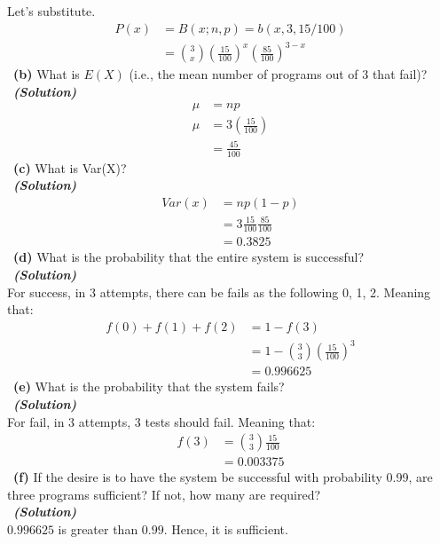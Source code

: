 \documentclass[a4 paper]{article}
\numberwithin{equation}{section}
\newcommand{\subproblem}[1]{~\newline\textbf{(#1)}}
\newcommand{\solution}{~\newline\textbf{\textit{(Solution)}} }
\newcommand{\0}{\mathbf{0}}
\begin{document}
Let's substitute.
\begin{align*}
    P(x) &= B(x; n, p) = b(x, 3, 15 / 100) \\
    &= \binom{3}{x} (\frac{15}{100})^x (\frac{85}{100})^{3-x} 
\end{align*}{}
\newline
\subproblem{b} What is $E(X)$ (i.e., the mean number of programs out of 3 that fail)?\\
\solution \\
\begin{align*}
    \mu &= np \\
    \mu &= 3 (\frac{15}{100}) \\
    &= \frac{45}{100}
\end{align*}{}
\newline
\subproblem{c} What is Var(X)?\\
\solution \\
\begin{align*}
    Var(x) &= np(1-p) \\
    &= 3 \frac{15}{100}\frac{85}{100} \\
    &= 0.3825
\end{align*}{}
\newline
\subproblem{d} What is the probability that the entire system is successful?\\
\solution \\
For success, in 3 attempts, there can be fails as the following 0, 1, 2. Meaning that:
\begin{align*}
    f(0) + f(1) + f(2) &= 1 - f(3) \\ 
    &= 1 - \binom{3}{3} (\frac{15}{100})^3 \\
    &= 0.996625
\end{align*}{}
\newline
\subproblem{e} What is the probability that the system fails?\\
\solution \\
For fail, in 3 attempts, 3 tests should fail. Meaning that:
\begin{align*}
    f(3) &= \binom{3}{3} \frac{15}{100} \\
    &= 0.003375
\end{align*}{}
\newline
\subproblem{f} If the desire is to have the system be successful with probability 0.99, are three programs sufficient? If not, how many are required?\\
\solution \\
$0.996625$ is greater than $0.99$. Hence, it is sufficient.
\end{document}
